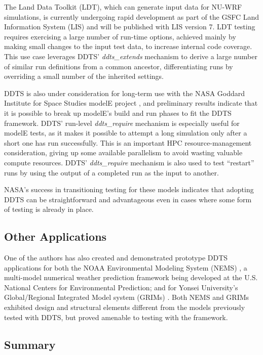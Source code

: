 \documentclass[conference]{IEEEtran}
\begin{document}
The Land Data Toolkit (LDT), which can generate input data for NU-WRF simulations, is currently undergoing rapid development as part of the GSFC Land Information System (LIS) \cite{lis} and will be published with LIS version 7. LDT testing requires exercising a large number of run-time options, achieved mainly by making small changes to the input test data, to increase internal code coverage. This use case leverages DDTS' \emph{ddts\_extends} mechanism to derive a large number of similar run definitions from a common ancestor, differentiating runs by overriding a small number of the inherited settings.

DDTS is also under consideration for long-term use with the NASA Goddard Institute for Space Studies modelE project \cite{modele}, and preliminary results indicate that it is possible to break up modelE's build and run phases to fit the DDTS framework. DDTS' run-level \emph{ddts\_require} mechanism is especially useful for modelE tests, as it makes it possible to attempt a long simulation only after a short one has run successfully. This is an important HPC resource-management consideration, giving up some available parallelism to avoid wasting valuable compute resources. DDTS' \emph{ddts\_require} mechanism is also used to test ``restart'' runs by using the output of a completed run as the input to another.

NASA's success in transitioning testing for these models indicates that adopting DDTS can be straightforward and advantageous even in cases where some form of testing is already in place.

\subsection{Other Applications}

One of the authors has also created and demonstrated prototype DDTS applications for both the NOAA Environmental Modeling System (NEMS) \cite{nems}, a multi-model numerical weather prediction framework being developed at the U.S. National Centers for Environmental Prediction; and for Yonsei University's Global/Regional Integrated Model system (GRIMs) \cite{grims}. Both NEMS and GRIMs exhibited design and structural elements different from the models previously tested with DDTS, but proved amenable to testing with the framework.

\subsection{Summary}
\end{document}
